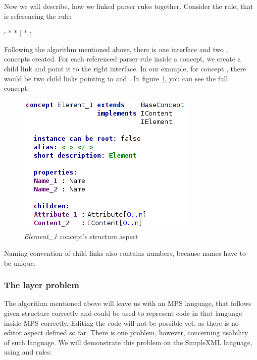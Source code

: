 Now we will describe, how we linked parser rules together.
Consider the  rule, that is referencing the  rule:

\begin{antlr}
	    :   \literal{<}  * \literal{>} * \literal{</}  \literal{>}
           |   \literal{<}  * \literal{/>}
           ;
\end{antlr}

Following the algorithm mentioned above, there is one  interface and two ,  concepts created.
For each referenced parser rule inside a concept, we create a child link and point it to the right interface.
In our example, for concept , there would be two child links pointing to  and .
In figure \ref{fig:element_concept_full}, you can see the full  concept.

\begin{figure}[h]
	\centering
	\includegraphics[scale=0.7]{./img/element_concept_full.png}
	\caption{\textit{Element{\_}1} concept's structure aspect}
	\label{fig:element_concept_full}
\end{figure}

Naming convention of child links also contains numbers, because names have to be unique.

\subsubsection{The layer problem}
\label{chap:layer_problem}

The algorithm mentioned above will leave us with an MPS language, that follows given structure correctly and could be used to represent code in that language inside MPS correctly. Editing the code will not be possible yet, as there is no editor aspect defined so far.
There is one problem, however, concerning usability of such language.
We will demonstrate this problem on the SimpleXML language, using  and  rules:

